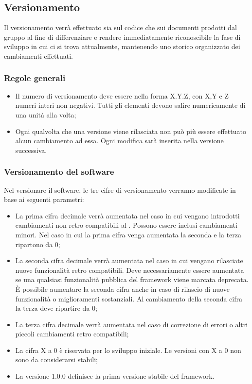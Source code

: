 \newpage
\subsection{Versionamento}
\label{6.0}
Il versionamento verrà effettuato sia sul codice che sui documenti prodotti dal gruppo al fine di differenziare e rendere immediatamente riconoscibile la fase di sviluppo in cui ci si trova attualmente, mantenendo uno storico organizzato dei cambiamenti effettuati.

\subsubsection{Regole generali}
\label{6.1}
\begin{itemize}
\item Il numero di versionamento deve essere nella forma X.Y.Z, con X,Y e Z numeri interi non negativi. Tutti gli elementi devono salire numericamente di una unità alla volta;
\item Ogni qualvolta che una versione viene rilasciata non può più essere effettuato alcun cambiamento ad essa. Ogni modifica sarà inserita nella versione successiva.
\end{itemize}

\subsubsection{Versionamento del software}
\label{6.2}
Nel versionare il software, le tre cifre di versionamento verranno modificate in base ai seguenti parametri:
\begin{itemize}
\item La prima cifra decimale verrà aumentata nel caso in cui vengano introdotti cambiamenti non retro compatibili al . Possono essere inclusi cambiamenti minori. Nel caso in cui la prima cifra venga aumentata la seconda e la terza ripartono da 0;
\item La seconda cifra decimale verrà aumentata nel caso in cui vengano rilasciate nuove funzionalità retro compatibili. Deve necessariamente essere aumentata se una qualsiasi funzionalità pubblica del framework viene marcata deprecata. È possibile aumentare la seconda cifra anche in caso di rilascio di nuove funzionalità o miglioramenti sostanziali. Al cambiamento della seconda cifra la terza deve ripartire da 0;
\item La terza cifra decimale verrà aumentata nel caso di correzione di errori o altri piccoli cambiamenti retro compatibili;
\item La cifra X a 0 è riservata per lo sviluppo iniziale. Le versioni con X a 0 non sono da considerarsi stabili;
\item La versione 1.0.0 definisce la prima versione stabile del framework.
\end{itemize}

